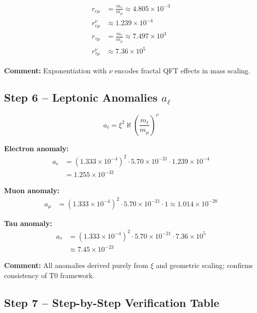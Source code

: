 \documentclass[12pt,a4paper]{article}
\begin{document}
\begin{align}
	r_{e\mu} &= \frac{m_e}{m_\mu} \approx 4.805 \times 10^{-3} \\
	r_{e\mu}^{\nu} &\approx 1.239 \times 10^{-4} \\
	r_{\tau\mu} &= \frac{m_\tau}{m_\mu} \approx 7.497 \times 10^3 \\
	r_{\tau\mu}^{\nu} &\approx 7.36 \times 10^5
\end{align}

\textbf{Comment:} Exponentiation with \(\nu\) encodes fractal QFT effects in mass scaling.

\subsection{Step 6 – Leptonic Anomalies \(a_\ell\)}

\begin{equation}
	a_\ell = \xi^2 \aleph \left(\frac{m_\ell}{m_\mu}\right)^\nu
\end{equation}

\textbf{Electron anomaly:}
\begin{align}
	a_e &= (1.333 \times 10^{-4})^2 \cdot 5.70 \times 10^{-21} \cdot 1.239 \times 10^{-4} \\
	&= 1.255 \times 10^{-32}
\end{align}

\textbf{Muon anomaly:}
\begin{align}
	a_\mu &= (1.333 \times 10^{-4})^2 \cdot 5.70 \times 10^{-21} \cdot 1 \approx 1.014 \times 10^{-28}
\end{align}

\textbf{Tau anomaly:}
\begin{align}
	a_\tau &= (1.333 \times 10^{-4})^2 \cdot 5.70 \times 10^{-21} \cdot 7.36 \times 10^5 \\
	&\approx 7.45 \times 10^{-23}
\end{align}

\textbf{Comment:} All anomalies derived purely from $\xi$ and geometric scaling; confirms consistency of T0 framework.

\subsection{Step 7 – Step-by-Step Verification Table}
\end{document}

